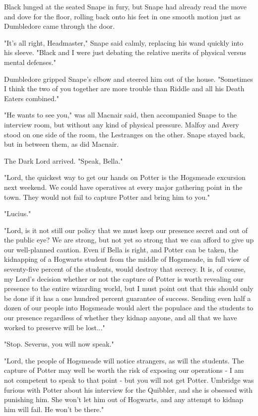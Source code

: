 Black lunged at the seated Snape in fury, but Snape had already read the move and dove for the floor, rolling back onto his feet in one smooth motion just as Dumbledore came through the door.

"It's all right, Headmaster," Snape said calmly, replacing his wand quickly into his sleeve. "Black and I were just debating the relative merits of physical versus mental defenses."

Dumbledore gripped Snape's elbow and steered him out of the house. "Sometimes I think the two of you together are more trouble than Riddle and all his Death Eaters combined."

\sbreak

"He wants to see you," was all Macnair said, then accompanied Snape to the interview room, but without any kind of physical pressure. Malfoy and Avery stood on one side of the room, the Lestranges on the other. Snape stayed back, but in between them, as did Macnair.

The Dark Lord arrived. "Speak, Bella."

"Lord, the quickest way to get our hands on Potter is the Hogsmeade excursion next weekend. We could have operatives at every major gathering point in the town. They would not fail to capture Potter and bring him to you."

"Lucius."

"Lord, is it not still our policy that we must keep our presence secret and out of the public eye? We are strong, but not yet so strong that we can afford to give up our well-planned caution. Even if Bella is right, and Potter can be taken, the kidnapping of a Hogwarts student from the middle of Hogsmeade, in full view of seventy-five percent of the students, would destroy that secrecy. It is, of course, my Lord's decision whether or not the capture of Potter is worth revealing our presence to the entire wizarding world, but I must point out that this should only be done if it has a one hundred percent guarantee of success. Sending even half a dozen of our people into Hogsmeade would alert the populace and the students to our presence regardless of whether they kidnap anyone, and all that we have worked to preserve will be lost..."

"Stop. Severus, you will now speak."

"Lord, the people of Hogsmeade will notice strangers, as will the students. The capture of Potter may well be worth the risk of exposing our operations - I am not competent to speak to that point - but you will not get Potter. Umbridge was furious with Potter about his interview for the Quibbler, and she is obsessed with punishing him. She won't let him out of Hogwarts, and any attempt to kidnap him will fail. He won't be there."


